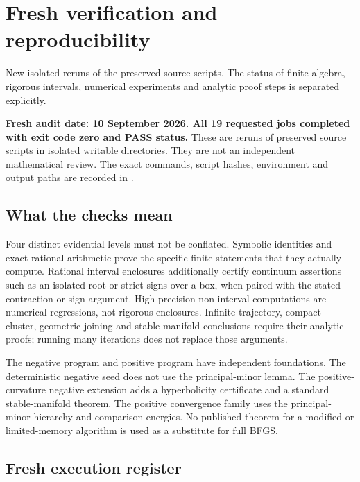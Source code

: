 \documentclass[10pt,oneside,openany]{book}
\newcommand{\ModuleTag}{I}
\theoremstyle{remark}\newtheorem{remark}{Remark}[chapter]
\newcommand{\StartModule}[3]{\cleardoublepage\renewcommand{\ModuleTag}{#1}\chapter{#2}\label{#1:chapter}\begin{small}\color{Accent}#3\end{small}\par\vspace{3pt}{\color{RuleGray}\hrule}\vspace{9pt}}
\begin{document}
\endgroup


\StartModule{E}{Fresh verification and reproducibility}{New isolated reruns of the preserved source scripts. The status of finite algebra, rigorous intervals, numerical experiments and analytic proof steps is separated explicitly.}

\textbf{Fresh audit date: 10 September 2026. All 19 requested jobs completed with exit code zero and PASS status.} These are reruns of preserved source scripts in isolated writable directories. They are not an independent mathematical review. The exact commands, script hashes, environment and output paths are recorded in .

\section{What the checks mean}\label{what-the-checks-mean}

Four distinct evidential levels must not be conflated. Symbolic identities and exact rational arithmetic prove the specific finite statements that they actually compute. Rational interval enclosures additionally certify continuum assertions such as an isolated root or strict signs over a box, when paired with the stated contraction or sign argument. High-precision non-interval computations are numerical regressions, not rigorous enclosures. Infinite-trajectory, compact-cluster, geometric joining and stable-manifold conclusions require their analytic proofs; running many iterations does not replace those arguments.

The negative program and positive program have independent foundations. The deterministic negative seed does not use the principal-minor lemma. The positive-curvature negative extension adds a hyperbolicity certificate and a standard stable-manifold theorem. The positive convergence family uses the principal-minor hierarchy and comparison energies. No published theorem for a modified or limited-memory algorithm is used as a substitute for full BFGS.

\section{Fresh execution register}\label{fresh-execution-register}
\end{document}
